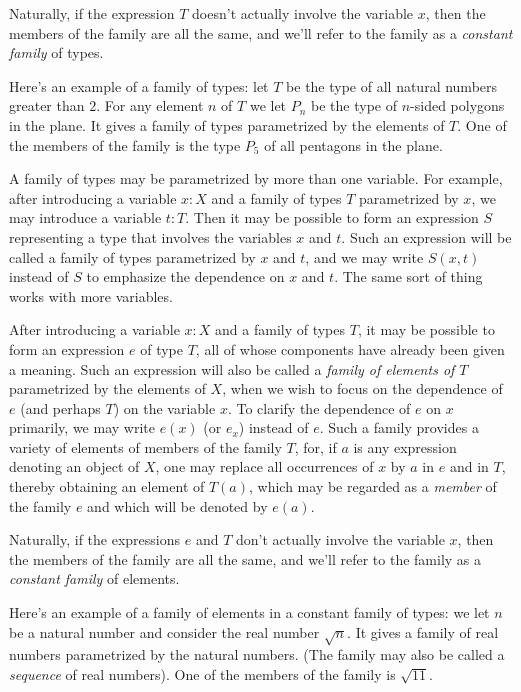 Naturally, if the expression $T$ doesn't actually involve the variable $x$, then the members of the family are all the same,
and we'll refer to the family as a \emph{constant family} of types.

Here's an example of a family of types: let $T$ be the type
of all natural numbers greater than $2$. For any element $n$ of $T$
we let $P_n$ be the type of $n$-sided polygons in the plane.
It gives a family of types parametrized by the elements of $T$.
One of the members of the family is the type $P_5$ of all pentagons in the plane.

A family of types may be parametrized by more than one variable.  For example, after introducing a variable $x:X$ and a family of types $T$
parametrized by $x$, we may introduce a variable $t:T$.  Then it may be possible to form an expression $S$ representing a type that involves the
variables $x$ and $t$.  Such an expression will be called a family of types parametrized by $x$ and $t$, and we may write $S(x,t)$ instead of
$S$ to emphasize the dependence on $x$ and $t$.  The same sort of thing works with more variables.

After introducing a variable $x:X$ and a family of types $T$, it may be possible to form an expression $e$ of type $T$, all of whose components have already been
given a meaning.
Such an expression will also be called a \emph{family of elements of $T$}  parametrized by the elements of $X$, when
we wish to focus on the dependence of $e$ (and perhaps $T$) on the variable $x$.
To clarify the dependence of $e$ on $x$ primarily, we may write $e(x)$ (or $e_x$) instead of $e$.
Such a family provides a variety of elements of members of the family $T$, for, if $a$ is any expression denoting an object of $X$, one may replace all
occurrences of $x$ by $a$ in $e$ and in $T$, thereby obtaining an element of $T(a)$, which may be regarded as a \emph{member} of the family $e$
and which will be denoted by $e(a)$.

Naturally, if the expressions $e$ and $T$ don't actually involve the variable $x$, then the members of the family are all the same,
and we'll refer to the family as a \emph{constant family} of elements.

Here's an example of a family of elements in a constant family of types: we let $n$ be a natural number and consider the real number $\sqrt n$.
It gives a family of real numbers parametrized by the natural numbers.
(The family may also be called a \emph{sequence} of real numbers).
One of the members of the family is $\sqrt{11}$.

